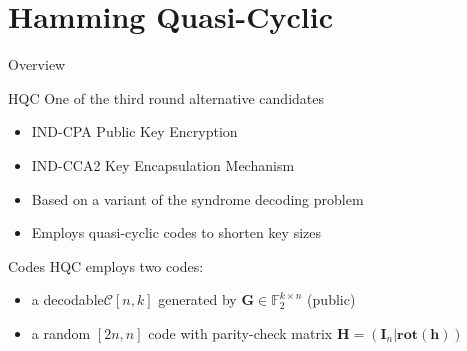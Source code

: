 
\section{Hamming Quasi-Cyclic}
\begin{frame}
    \sectionpage
\end{frame}

\begin{frame}{Overview}
    \begin{block}{HQC}
        One of the third round alternative candidates
        \begin{itemize}
            \item IND-CPA Public Key Encryption
            \item IND-CCA2 Key Encapsulation Mechanism
            \item Based on a variant of the syndrome decoding problem
            \item Employs quasi-cyclic codes to shorten key sizes
        \end{itemize}
    \end{block}
    \begin{block}{Codes}
        HQC employs two codes:
        \begin{itemize}
            \item a decodable$\mathcal{C} [n, k]$ generated by $\mathbf{G}\in \mathds{F}_{2}^{k\times n}$ (public) 
            \item a random $[2n, n]$ code with parity-check matrix $\mathbf{H} = (\mathbf{I}_n | \mathbf{rot(h)})$
        \end{itemize}
    \end{block}
\end{frame}

